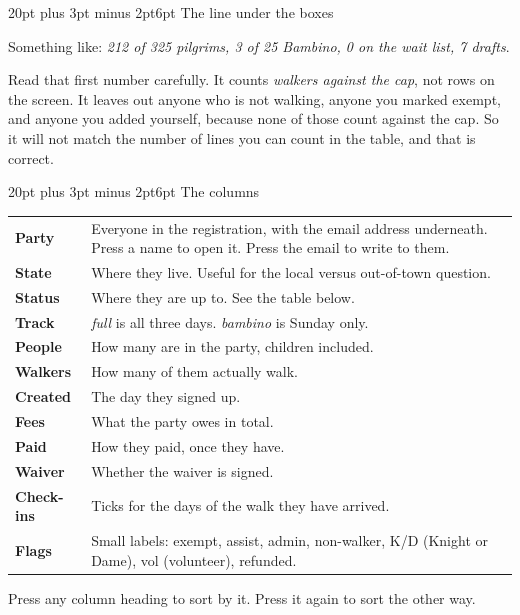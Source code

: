 \documentclass[12pt]{article}
\makeatletter
\renewcommand\subsection{\@startsection{subsection}{2}{0pt}%
  {20pt plus 3pt minus 2pt}{6pt}%
  {\normalfont\large\bfseries\color{ink}}}
\makeatother
\begin{document}
\subsection{The line under the boxes}

Something like: \textit{212 of 325 pilgrims, 3 of 25 Bambino, 0 on the
wait list, 7 drafts}.

Read that first number carefully. It counts \emph{walkers against the
cap}, not rows on the screen. It leaves out anyone who is not walking,
anyone you marked exempt, and anyone you added yourself, because none of
those count against the cap. So it will not match the number of lines
you can count in the table, and that is correct.

\subsection{The columns}

\begin{tabularx}{\linewidth}{@{}L{1.35in}Y@{}}
\toprule
\textbf{Party} & Everyone in the registration, with the email address
underneath. Press a name to open it. Press the email to write to them. \\
\textbf{State} & Where they live. Useful for the local versus
out-of-town question. \\
\textbf{Status} & Where they are up to. See the table below. \\
\textbf{Track} & \textit{full} is all three days. \textit{bambino} is
Sunday only. \\
\textbf{People} & How many are in the party, children included. \\
\textbf{Walkers} & How many of them actually walk. \\
\textbf{Created} & The day they signed up. \\
\textbf{Fees} & What the party owes in total. \\
\textbf{Paid} & How they paid, once they have. \\
\textbf{Waiver} & Whether the waiver is signed. \\
\textbf{Check-ins} & Ticks for the days of the walk they have arrived. \\
\textbf{Flags} & Small labels: exempt, assist, admin, non-walker, K/D
(Knight or Dame), vol (volunteer), refunded. \\
\bottomrule
\end{tabularx}

Press any column heading to sort by it. Press it again to sort the
other way.
\end{document}
